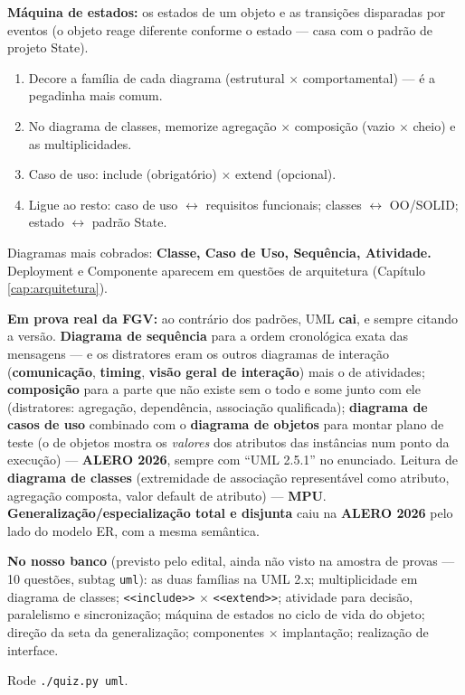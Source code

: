 \textbf{Máquina de estados:} os estados de um objeto e as transições
disparadas por eventos (o objeto reage diferente conforme o estado --- casa
com o padrão de projeto State).

\begin{comosair}
\begin{enumerate}
\item Decore a família de cada diagrama (estrutural $\times$
comportamental) --- é a pegadinha mais comum.
\item No diagrama de classes, memorize agregação $\times$ composição (vazio
$\times$ cheio) e as multiplicidades.
\item Caso de uso: include (obrigatório) $\times$ extend (opcional).
\item Ligue ao resto: caso de uso $\leftrightarrow$ requisitos funcionais;
classes $\leftrightarrow$ OO/SOLID; estado $\leftrightarrow$ padrão State.
\end{enumerate}
Diagramas mais cobrados: \textbf{Classe, Caso de Uso, Sequência, Atividade.}
Deployment e Componente aparecem em questões de arquitetura (Capítulo
\ref{cap:arquitetura}).
\end{comosair}

\begin{jacaiu}
\textbf{Em prova real da FGV:} ao contrário dos padrões, UML \textbf{cai}, e
sempre citando a versão. \textbf{Diagrama de sequência} para a ordem
cronológica exata das mensagens --- e os distratores eram os outros diagramas
de interação (\textbf{comunicação}, \textbf{timing}, \textbf{visão geral de
interação}) mais o de atividades; \textbf{composição} para a parte que não
existe sem o todo e some junto com ele (distratores: agregação, dependência,
associação qualificada); \textbf{diagrama de casos de uso} combinado com o
\textbf{diagrama de objetos} para montar plano de teste (o de objetos mostra
os \emph{valores} dos atributos das instâncias num ponto da execução) ---
\textbf{ALERO 2026}, sempre com ``UML 2.5.1'' no enunciado. Leitura de
\textbf{diagrama de classes} (extremidade de associação representável como
atributo, agregação composta, valor default de atributo) --- \textbf{MPU}.
\textbf{Generalização/especialização total e disjunta} caiu na
\textbf{ALERO 2026} pelo lado do modelo ER, com a mesma semântica.

\textbf{No nosso banco} (previsto pelo edital, ainda não visto na amostra de
provas --- 10 questões, subtag \texttt{uml}): as duas famílias na UML 2.x;
multiplicidade em diagrama de classes; \texttt{<<include>>} $\times$
\texttt{<<extend>>}; atividade para decisão, paralelismo e sincronização;
máquina de estados no ciclo de vida do objeto; direção da seta da
generalização; componentes $\times$ implantação; realização de interface.

Rode \texttt{./quiz.py uml}.
\end{jacaiu}

